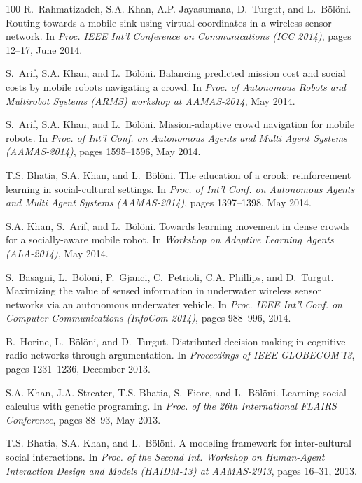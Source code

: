 \begin{thebibliography}{100}
R.~Rahmatizadeh, S.A. Khan, A.P. Jayasumana, D.~Turgut, and L.~Bölöni.
\newblock Routing towards a mobile sink using virtual coordinates in a wireless
  sensor network.
\newblock In {\em Proc. IEEE Int'l Conference on Communications (ICC 2014)},
  pages 12--17, June 2014.

S.~Arif, S.A. Khan, and L.~Bölöni.
\newblock Balancing predicted mission cost and social costs by mobile robots
  navigating a crowd.
\newblock In {\em Proc. of Autonomous Robots and Multirobot Systems (ARMS)
  workshop at AAMAS-2014}, May 2014.

S.~Arif, S.A. Khan, and L.~Bölöni.
\newblock Mission-adaptive crowd navigation for mobile robots.
\newblock In {\em Proc. of Int'l Conf. on Autonomous Agents and Multi Agent
  Systems (AAMAS-2014)}, pages 1595--1596, May 2014.

T.S. Bhatia, S.A. Khan, and L.~Bölöni.
\newblock The education of a crook: reinforcement learning in social-cultural
  settings.
\newblock In {\em Proc. of Int'l Conf. on Autonomous Agents and Multi Agent
  Systems (AAMAS-2014)}, pages 1397--1398, May 2014.

S.A. Khan, S.~Arif, and L.~Bölöni.
\newblock Towards learning movement in dense crowds for a socially-aware mobile
  robot.
\newblock In {\em Workshop on Adaptive Learning Agents (ALA-2014)}, May 2014.

S.~Basagni, L.~Bölöni, P.~Gjanci, C.~Petrioli, C.A. Phillips, and D.~Turgut.
\newblock Maximizing the value of sensed information in underwater wireless
  sensor networks via an autonomous underwater vehicle.
\newblock In {\em Proc. IEEE Int'l Conf. on Computer Communications
  (InfoCom-2014)}, pages 988--996, 2014.

B.~Horine, L.~Bölöni, and D.~Turgut.
\newblock Distributed decision making in cognitive radio networks through
  argumentation.
\newblock In {\em Proceedings of IEEE GLOBECOM'13}, pages 1231--1236, December
  2013.

S.A. Khan, J.A. Streater, T.S. Bhatia, S.~Fiore, and L.~Bölöni.
\newblock Learning social calculus with genetic programing.
\newblock In {\em Proc. of the 26th International FLAIRS Conference}, pages
  88--93, May 2013.

T.S. Bhatia, S.A. Khan, and L.~Bölöni.
\newblock A modeling framework for inter-cultural social interactions.
\newblock In {\em Proc. of the Second Int. Workshop on Human-Agent Interaction
  Design and Models (HAIDM-13) at AAMAS-2013}, pages 16--31, 2013.


\end{thebibliography}
